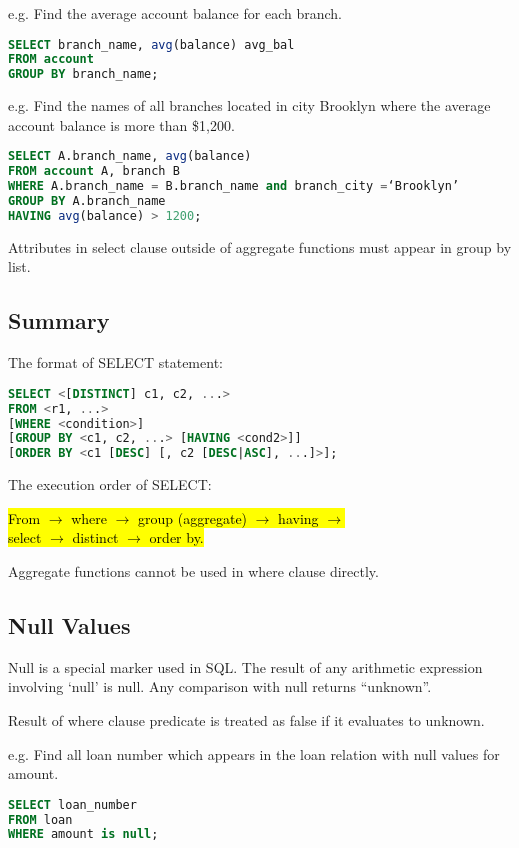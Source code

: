 e.g. Find the average account balance for each branch.
\begin{lstlisting}[language=sql]
SELECT branch_name, avg(balance) avg_bal
FROM account
GROUP BY branch_name; 
\end{lstlisting}

e.g. Find the names of all branches located in city Brooklyn where the average account balance is more than \$1,200.
\begin{lstlisting}[language=sql]
SELECT A.branch_name, avg(balance)
FROM account A, branch B
WHERE A.branch_name = B.branch_name and branch_city =‘Brooklyn’
GROUP BY A.branch_name
HAVING avg(balance) > 1200;
\end{lstlisting}

Attributes in select clause outside of aggregate functions must appear in group by list.

\subsection{Summary}
The format of SELECT statement: 
\begin{lstlisting}[language=sql]
SELECT <[DISTINCT] c1, c2, ...>
FROM <r1, ...>
[WHERE <condition>]
[GROUP BY <c1, c2, ...> [HAVING <cond2>]]
[ORDER BY <c1 [DESC] [, c2 [DESC|ASC], ...]>];
\end{lstlisting}

The execution order of SELECT:

\hl{From $\rightarrow$ where $\rightarrow$ group (aggregate) $\rightarrow$ having $\rightarrow$ \\select $\rightarrow$ distinct $\rightarrow$ order by. }

Aggregate functions cannot be used in where clause directly.

\subsection{Null Values}
Null is a special marker used in SQL. The result of any arithmetic expression involving `null' is null. Any comparison with null returns ``unknown''. 

Result of where clause predicate is treated as false if it evaluates to unknown.

e.g. Find all loan number which appears in the loan relation with null values for amount.
\begin{lstlisting}[language=sql]
SELECT loan_number
FROM loan
WHERE amount is null;
\end{lstlisting}

